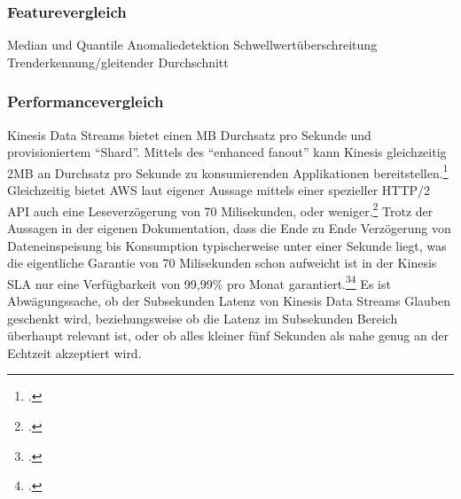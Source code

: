 \subsubsection{Featurevergleich}
Median und Quantile
Anomaliedetektion
Schwellwertüberschreitung
Trenderkennung/gleitender Durchschnitt

\subsubsection{Performancevergleich}
Kinesis Data Streams bietet einen MB Durchsatz pro Sekunde und provisioniertem \enquote{Shard}. Mittels des \enquote{enhanced fanout} kann Kinesis gleichzeitig 2MB an Durchsatz pro Sekunde zu konsumierenden Applikationen bereitstellen.\footcite[Vgl. auch im Folgenden][]{Hunt.2018} Gleichzeitig bietet \ac{AWS} laut eigener Aussage mittels einer spezieller HTTP/2 \ac{API} auch eine Leseverzögerung von 70 Milisekunden, oder weniger.\footcite[Vgl.][]{AmazonWebServicesInc..o.J.af} Trotz der Aussagen in der eigenen Dokumentation, dass die Ende zu Ende Verzögerung von Dateneinspeisung bis Konsumption typischerweise unter einer Sekunde liegt, was die eigentliche Garantie von 70 Milisekunden schon aufweicht  ist in der Kinesis \ac{SLA} nur eine Verfügbarkeit von 99,99\% pro Monat garantiert.\footcite[Vgl.][]{AmazonWebServicesInc..o.J.ae}\nzitat\footcite[Vgl.][]{AmazonWebServicesInc..o.J.ad} Es ist Abwägungssache, ob der Subsekunden Latenz von Kinesis Data Streams Glauben geschenkt wird, beziehungsweise ob die Latenz im Subsekunden Bereich überhaupt relevant ist, oder ob alles kleiner fünf Sekunden als nahe genug an der Echtzeit akzeptiert wird.

